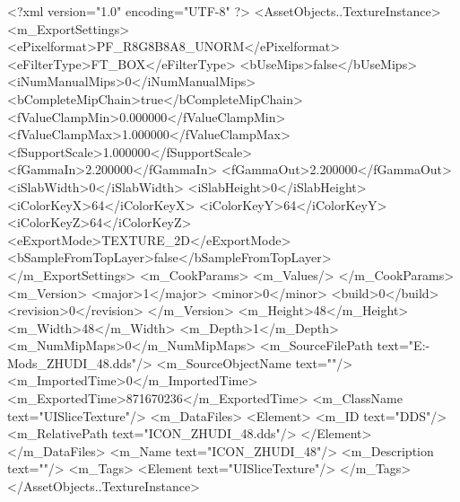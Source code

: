 <?xml version="1.0" encoding="UTF-8" ?>
<AssetObjects..TextureInstance>
	<m_ExportSettings>
		<ePixelformat>PF_R8G8B8A8_UNORM</ePixelformat>
		<eFilterType>FT_BOX</eFilterType>
		<bUseMips>false</bUseMips>
		<iNumManualMips>0</iNumManualMips>
		<bCompleteMipChain>true</bCompleteMipChain>
		<fValueClampMin>0.000000</fValueClampMin>
		<fValueClampMax>1.000000</fValueClampMax>
		<fSupportScale>1.000000</fSupportScale>
		<fGammaIn>2.200000</fGammaIn>
		<fGammaOut>2.200000</fGammaOut>
		<iSlabWidth>0</iSlabWidth>
		<iSlabHeight>0</iSlabHeight>
		<iColorKeyX>64</iColorKeyX>
		<iColorKeyY>64</iColorKeyY>
		<iColorKeyZ>64</iColorKeyZ>
		<eExportMode>TEXTURE_2D</eExportMode>
		<bSampleFromTopLayer>false</bSampleFromTopLayer>
	</m_ExportSettings>
	<m_CookParams>
		<m_Values/>
	</m_CookParams>
	<m_Version>
		<major>1</major>
		<minor>0</minor>
		<build>0</build>
		<revision>0</revision>
	</m_Version>
	<m_Height>48</m_Height>
	<m_Width>48</m_Width>
	<m_Depth>1</m_Depth>
	<m_NumMipMaps>0</m_NumMipMaps>
	<m_SourceFilePath text="E:\Games{}-Mods\Leaders\ZHUDI\pictrues\ICON_ZHUDI_48.dds"/>
	<m_SourceObjectName text=""/>
	<m_ImportedTime>0</m_ImportedTime>
	<m_ExportedTime>871670236</m_ExportedTime>
	<m_ClassName text="UISliceTexture"/>
	<m_DataFiles>
		<Element>
			<m_ID text="DDS"/>
			<m_RelativePath text="ICON_ZHUDI_48.dds"/>
		</Element>
	</m_DataFiles>
	<m_Name text="ICON_ZHUDI_48"/>
	<m_Description text=""/>
	<m_Tags>
		<Element text="UISliceTexture"/>
	</m_Tags>
</AssetObjects..TextureInstance>

